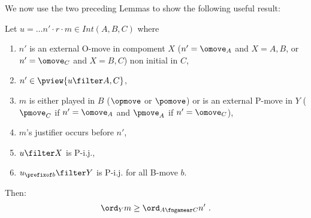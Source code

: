 We now use the two preceding Lemmas to show
the following useful result:
\begin{lemma}
\label{lem:increasing_order}
Let $u = \ldots n' \cdot r \cdot m \in Int(A,B,C)$ where
\begin{enumerate}
\item 
$n'$ is an external O-move in compoment $X$ 
($n'=\omove_A$ and $X=A,B$, or $n'=\omove_C$ and $X=B,C$)  non initial in $C$,
\item $n' \in \pview{u\filter A,C}$,
\item $m$ is either played in $B$ 
($\opmove$ or $\pomove$) or is an external
 P-move in $Y$
($\pmove_C$ if $n'=\omove_A$ and 
$\pmove_A$ if $n'=\omove_C$),
\item $m$'s justifier occurs before $n'$,
\item $u\filter X$ is P-i.j.,
\item $u_{\prefixof b}\filter Y$ is P-i.j. for all B-move $b$.
\end{enumerate}
Then:
$$ \ord_{Y} m \geq \ord_{A\fngamear C} n' \ .$$
\end{lemma}
